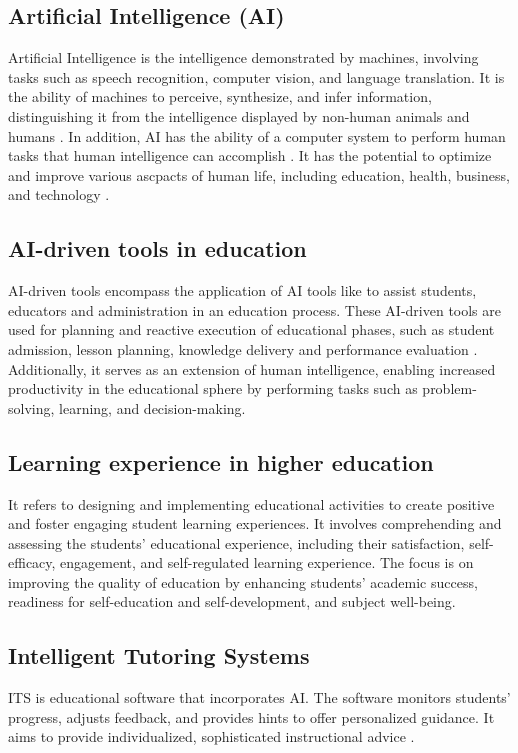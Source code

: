 \subsection{Artificial Intelligence (AI)}
Artificial Intelligence is the intelligence demonstrated by machines,
involving tasks such as speech recognition, computer vision,
and language translation.  It is the ability of machines to perceive, synthesize, and infer information,
distinguishing it from the intelligence displayed by non-human animals and humans \citep{ola_artificial_2023}.
In addition, AI has the ability of  a computer system
to perform human tasks that
human intelligence can accomplish \citep{sadiku_ai_2021}.
It has the potential to optimize and improve various ascpacts
of human life, including education, health, business,
and technology \citep{cheng_widespread_2023}.
\subsection{AI-driven tools in education}
AI-driven tools encompass the application of AI tools like  to assist students,
educators and administration in an education process. These AI-driven tools are used for
planning and reactive execution of educational phases, such as student admission, lesson planning,
knowledge delivery and performance evaluation \citep{mallik_proactive_2023}.
Additionally, it serves as an extension of human intelligence, enabling increased productivity in
the educational sphere by performing tasks such as problem-solving, learning, and decision-making\citep{cheng_widespread_2023}.
\subsection{Learning experience in higher education}
It refers to designing and implementing educational activities to create positive
and foster engaging student learning experiences\citep{kang_supporting_2023}.
It involves comprehending and assessing the students’ educational experience, including their satisfaction,
self-efficacy, engagement, and self-regulated learning experience\citep{lyz_students_2022}.
The focus is on improving the quality of education by enhancing students’ academic success,
readiness for self-education and self-development, and subject well-being\citep{iordache-platis_building_2018}.
\subsection{Intelligent Tutoring Systems}
ITS is educational software that incorporates AI. The software monitors students’ progress,
adjusts feedback, and provides hints to offer personalized guidance\citep{shute_intelligent_2010}. It aims to provide individualized, sophisticated instructional advice
\citep{sedlmeier_intelligent_2001}.
